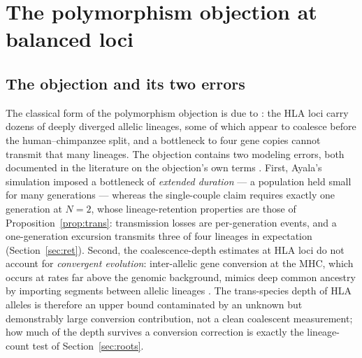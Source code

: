 \section{The polymorphism objection at balanced loci}\label{sec:poly}

\subsection{The objection and its two errors}
The classical form of the polymorphism objection is due to
\citet{Ayala1995}: the HLA loci carry dozens of deeply diverged allelic
lineages, some of which appear to coalesce before the human--chimpanzee
split, and a bottleneck to four gene copies cannot transmit that many
lineages. The objection contains two modeling errors, both documented in
the literature on the objection's own terms \citep{Gauger2012,
GarriganHedrick2003}. First, Ayala's
simulation imposed a bottleneck of \emph{extended duration} --- a population
held small for many generations --- whereas the single-couple claim
requires exactly one generation at $N=2$, whose lineage-retention
properties are those of Proposition~\ref{prop:trans}: transmission
losses are per-generation events, and a one-generation excursion
transmits three of four lineages in expectation (Section~\ref{sec:ret}).
Second, the coalescence-depth estimates at HLA loci do not account for
\emph{convergent evolution}: inter-allelic gene conversion at the MHC,
which occurs at rates far above the genomic background, mimics deep
common ancestry by importing segments between allelic lineages
\citep{GarriganHedrick2003}. The trans-species depth of HLA alleles is
therefore an
upper bound contaminated by an unknown but demonstrably large conversion
contribution, not a clean coalescent measurement; how much of the depth
survives a conversion correction is exactly the lineage-count test of
Section~\ref{sec:roots}.

